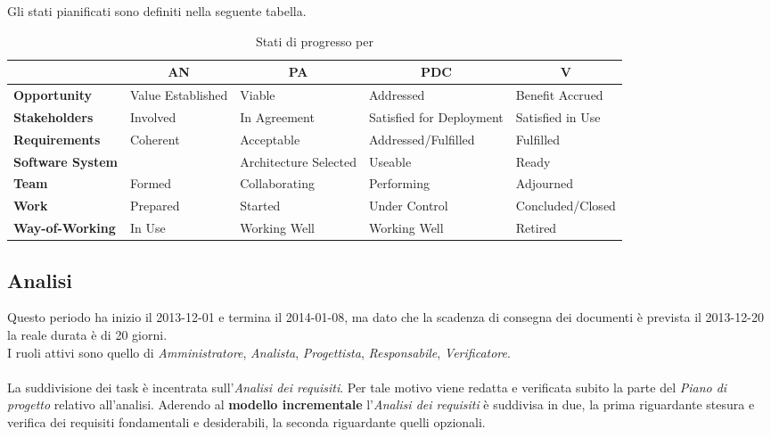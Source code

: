 Gli stati pianificati sono definiti nella seguente tabella.

\begin{table}[H]
	\begin{adjustwidth}{-4cm}{-4cm}
	\centering
	\begin{tabular}{ l l l l l }
	\hline
	&
	\multicolumn{1}{c}{\textbf{AN}} & 
	\multicolumn{1}{c}{\textbf{PA}} & 
	\multicolumn{1}{c}{\textbf{PDC}} & 
	\multicolumn{1}{c}{\textbf{V}} \\
	\hline

	\textbf{Opportunity} & Value Established & Viable & Addressed & Benefit Accrued \\
	\textbf{Stakeholders} & Involved & In Agreement & Satisfied for Deployment & Satisfied in Use \\
	\textbf{Requirements} & Coherent & Acceptable & Addressed/Fulfilled & Fulfilled \\
	\textbf{Software System} & & Architecture Selected & Useable & Ready \\
	\textbf{Team} & Formed & Collaborating & Performing & Adjourned \\
	\textbf{Work} & Prepared & Started & Under Control & Concluded/Closed \\
	\textbf{Way-of-Working} & In Use & Working Well & Working Well & Retired \\

	\hline
	\end{tabular}
	\caption{Stati di progresso per }
	\label{StatiSEMAT}
	\end{adjustwidth}
\end{table}

	\subsection{Analisi}

Questo periodo ha inizio il 2013-12-01 e termina il 2014-01-08, ma dato che la scadenza di consegna dei documenti è prevista il 2013-12-20 la reale durata è di 20 giorni. \\
I ruoli attivi sono quello di \textit{Amministratore}, \textit{Analista}, \textit{Progettista}, \textit{Responsabile}, \textit{Verificatore}. \\ \\
La suddivisione dei task è incentrata sull'\textit{Analisi dei requisiti}. Per tale motivo viene redatta e verificata subito la parte del \textit{Piano di progetto} relativo all'analisi.
Aderendo al \textbf{modello incrementale} l'\textit{Analisi dei requisiti} è suddivisa in due, la prima riguardante stesura e verifica dei requisiti fondamentali e desiderabili, la seconda riguardante quelli opzionali.
